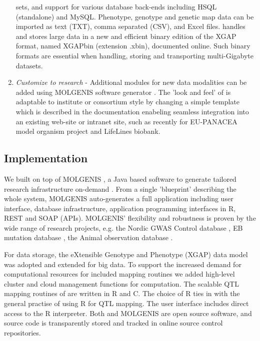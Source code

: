 \begin{enumerate}
sets, and support for various database back-ends including HSQL (standalone) and MySQL. Phenotype, 
genotype and genetic map data can be imported as text (TXT), comma separated (CSV), and Excel files. 
\xqtlwb handles and stores large data in a new and efficient binary edition of the XGAP format, named 
XGAPbin (extension .xbin), documented online. Such binary formats are essential when handling, storing 
and transporting multi-Gigabyte datasets.
\item \emph{Customize to research} - Additional modules for new data modalities can be added using 
MOLGENIS software generator \cite{Swertz:2010b}. The 'look and feel' of \xqtlwb is adaptable to 
institute or consortium style by changing a simple template which is described in the \xqtlwb 
documentation enabeling seamless integration into an existing web-site or intranet site, such as 
recently for EU-PANACEA model organism project and LifeLines biobank.
\end{enumerate}

\subsection{Implementation}
We built \xqtlwb on top of MOLGENIS \cite{Swertz:2004}, a Java based software to generate tailored 
research infrastructure on-demand \cite{Swertz:2007}. From a single 'blueprint' describing the whole 
system, MOLGENIS auto-generates a full application including user interface, database infrastructure, 
application programming interfaces in R, REST and SOAP (APIs). MOLGENIS' flexibility and robustness 
is proven by the wide range of research projects, e.g. the Nordic GWAS Control database \cite{Leu:2010}, 
EB mutation database \cite{Akker:2011}, the Animal observation database \cite{Swertz:2010b}.

For data storage, the eXtensible Genotype and Phenotype (XGAP) data model was adopted \cite{Swertz:2010a} 
and extended for big data. To support the increased demand for computational resources for included 
mapping routines we added high-level cluster and cloud management functions for computation. The 
scalable QTL mapping routines of \xqtlwb are written in R and C. The choice of R ties in with the 
general practise of using R for QTL mapping. The user interface includes direct access to the R 
interpreter. Both \xqtlwb and MOLGENIS are open source software, and source code is transparently
stored and tracked in online source control repositories.

